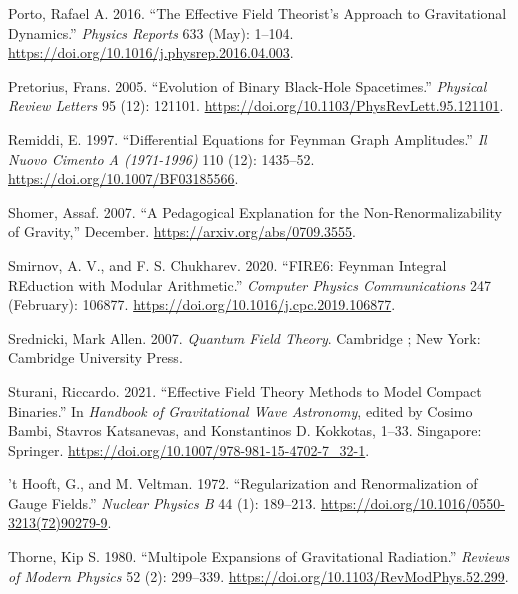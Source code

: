 \documentclass[
  11pt,
  a4paper,
  DIV=11,
  numbers=noendperiod,
  oneside]{scrreprt}
\newlength{\cslhangindent}
\newlength{\cslentryspacingunit} %
\newenvironment{CSLReferences}[2] %
 {%
  \setlength{\parindent}{0pt}
  \ifodd #1
  \let\oldpar\par
  \def\par{\hangindent=\cslhangindent\oldpar}
  \fi
  \setlength{\parskip}{#2\cslentryspacingunit}
 }%
 {}
\DeclareRobustCommand{\[}{\begin{equation}}
\DeclareRobustCommand{\]}{\end{equation}}
\begin{document}
\begin{CSLReferences}{1}{0}
\leavevmode{}%
Porto, Rafael A. 2016. {``The {Effective Field Theorist}'s {Approach} to
{Gravitational Dynamics}.''} \emph{Physics Reports} 633 (May): 1--104.
\url{https://doi.org/10.1016/j.physrep.2016.04.003}.

\leavevmode{}%
Pretorius, Frans. 2005. {``Evolution of {Binary Black-Hole
Spacetimes}.''} \emph{Physical Review Letters} 95 (12): 121101.
\url{https://doi.org/10.1103/PhysRevLett.95.121101}.

\leavevmode{}%
Remiddi, E. 1997. {``Differential Equations for {Feynman} Graph
Amplitudes.''} \emph{Il Nuovo Cimento A (1971-1996)} 110 (12): 1435--52.
\url{https://doi.org/10.1007/BF03185566}.

\leavevmode{}%
Shomer, Assaf. 2007. {``A Pedagogical Explanation for the
Non-Renormalizability of Gravity,''} December.
\url{https://arxiv.org/abs/0709.3555}.

\leavevmode{}%
Smirnov, A. V., and F. S. Chukharev. 2020. {``{FIRE6}: {Feynman Integral
REduction} with {Modular Arithmetic}.''} \emph{Computer Physics
Communications} 247 (February): 106877.
\url{https://doi.org/10.1016/j.cpc.2019.106877}.

\leavevmode{}%
Srednicki, Mark Allen. 2007. \emph{Quantum Field Theory}. {Cambridge ;
New York}: {Cambridge University Press}.

\leavevmode{}%
Sturani, Riccardo. 2021. {``Effective {Field Theory Methods} to {Model
Compact Binaries}.''} In \emph{Handbook of {Gravitational Wave
Astronomy}}, edited by Cosimo Bambi, Stavros Katsanevas, and
Konstantinos D. Kokkotas, 1--33. {Singapore}: {Springer}.
\url{https://doi.org/10.1007/978-981-15-4702-7_32-1}.

\leavevmode{}%
't Hooft, G., and M. Veltman. 1972. {``Regularization and
Renormalization of Gauge Fields.''} \emph{Nuclear Physics B} 44 (1):
189--213. \url{https://doi.org/10.1016/0550-3213(72)90279-9}.

\leavevmode{}%
Thorne, Kip S. 1980. {``Multipole Expansions of Gravitational
Radiation.''} \emph{Reviews of Modern Physics} 52 (2): 299--339.
\url{https://doi.org/10.1103/RevModPhys.52.299}.


\end{CSLReferences}
\end{document}
